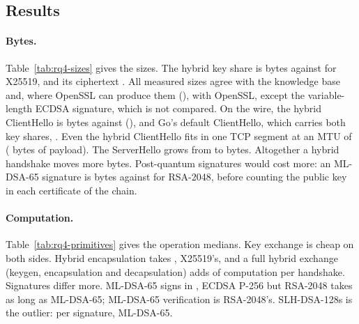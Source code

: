 \subsection{Results}

\begin{table}[t]
\centering\small

\caption{Sizes in bytes on the wire. For X25519 and P-256 the ciphertext is
the ephemeral public key. ECDSA signatures vary in length (DER); the maximum
is shown.}
\label{tab:rq4-sizes}
\end{table}

\paragraph{Bytes.} Table~\ref{tab:rq4-sizes} gives the sizes. The hybrid key
share is  bytes against
 for X25519, and its ciphertext
. All  measured
sizes agree with the knowledge base and, where OpenSSL can produce them
(), with OpenSSL, except the variable-length ECDSA
signature, which is not compared. On the wire, the hybrid ClientHello is
 bytes against 
(), and Go's default ClientHello, which carries both key
shares, . Even the hybrid ClientHello fits in one TCP
segment at an MTU of  ( bytes of payload).
The ServerHello grows from  to
 bytes. Altogether a hybrid handshake moves
 more bytes. Post-quantum signatures would
cost more: an ML-DSA-65 signature is  bytes
against  for RSA-2048, before counting the
public key in each certificate of the chain.

\begin{table}[t]
\centering\footnotesize\setlength{\tabcolsep}{4pt}

\caption{Median time per operation on the host ().
For signature schemes the columns are keygen, sign and verify.}
\label{tab:rq4-primitives}
\end{table}

\paragraph{Computation.} Table~\ref{tab:rq4-primitives} gives the operation
medians. Key exchange is cheap on both sides. Hybrid encapsulation takes
, 
X25519's, and a full hybrid exchange (keygen, encapsulation and
decapsulation) adds  of computation per
handshake. Signatures differ more. ML-DSA-65 signs in
, 
ECDSA P-256 but RSA-2048 takes  as long
as ML-DSA-65; ML-DSA-65 verification is
 RSA-2048's. SLH-DSA-128s is the
outlier:  per signature,
 ML-DSA-65.

